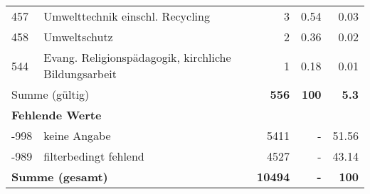 \begin{longtable}{lXrrr}
        457 & \multicolumn{1}{X}{Umwelttechnik einschl. Recycling} & %
          \num{3} &
          \num[round-mode=places,round-precision=2]{0.54} &
          \num[round-mode=places,round-precision=2]{0.03} \\

        458 & \multicolumn{1}{X}{Umweltschutz} & %
          \num{2} &
          \num[round-mode=places,round-precision=2]{0.36} &
          \num[round-mode=places,round-precision=2]{0.02} \\

        544 & \multicolumn{1}{X}{Evang. Religionspädagogik, kirchliche Bildungsarbeit} & %
          \num{1} &
          \num[round-mode=places,round-precision=2]{0.18} &
          \num[round-mode=places,round-precision=2]{0.01} \\

     \midrule
     \multicolumn{2}{l}{Summe (gültig)} &
       \textbf{\num{556}} &
     \textbf{\num{100}} &
       \textbf{\num[round-mode=places,round-precision=2]{5.3}} \\
     \multicolumn{5}{l}{\textbf{Fehlende Werte}}\\
       -998 &
       keine Angabe &
         \num{5411} &
        - &
         \num[round-mode=places,round-precision=2]{51.56} \\
       -989 &
       filterbedingt fehlend &
         \num{4527} &
        - &
         \num[round-mode=places,round-precision=2]{43.14} \\
     \midrule
     \multicolumn{2}{l}{\textbf{Summe (gesamt)}} &
          \textbf{\num{10494}} &
        \textbf{-} &
        \textbf{\num{100}} \\
     \bottomrule
     \end{longtable}
     
